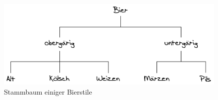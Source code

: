 \documentclass[
	vorläufig=true, 
	blattnr=5,
	ausgabe=2016-11-25,
	abgabe=2016-12-02,
	lösung,
	shortverb,
]{../tex/latexkurs-exercise}
\begin{document}
	\begin{figure}[]
		\centering
		\includegraphics{05_tree}
		\caption{Stammbaum einiger Bierstile}
		\label{fig:tree}
	\end{figure}

\end{document}
